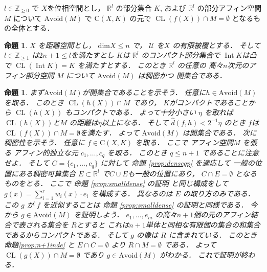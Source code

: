 \documentclass[leqno, a4paper, 12pt]{jsarticle}
\newtheorem{prop}[thm]{命題}
\newcommand{\zz}{\mathbb{Z}}
\newcommand{\rr}{\mathbb{R}}
\DeclareMathOperator{\cl}{CL}
\DeclareMathOperator{\nai}{Int}
\newcommand{\yodim}{\mathrm{dim}}
\newcommand{\yocovf}[1]{\mathcal{#1}}
\newcommand{\yosupmet}[1]{\widehat{#1}}
\newcommand{\yofuncsp}[2]{\mathrm{C}(#1, #2)}
\newcommand{\yoavoid}[1]{\mathrm{Avoid}(#1)}
\numberwithin{equation}{section}
\begin{document}
$l\in \zz_{\ge 0}$
で
$X$を位相空間とし，
$\rr^{l}$
の部分集合
$K$, および
$\rr^{l}$
の部分アフィン空間
$M$
について
$\yoavoid{M}$
で
$\yofuncsp{X}{K}$
の元で
$\cl (f(X))\cap M=\emptyset$
となるもの全体とする．
\begin{prop}
$X$
を距離空間とし，
$\yodim X\le n$
で，
$\yocovf{U}$
を$X$
の有限被覆とする．
そして
$l\in \zz_{\ge 1}$
は$2n+1\le l$を満たすとし
$K$は
$\rr^{l}$
のコンパクト部分集合で
$\nai K$は凸で
$\cl (\nai K)=K$
を満たすとする．
このとき
$\rr^{l}$
の任意の
高々$n$次元のアフィン部分空間
$M$
について
$\yoavoid{M}$
は稠密かつ
開集合である．
\end{prop}
\begin{prop}
まず$\yoavoid{M}$が開集合であることを示そう．
任意に$h\in \yoavoid{M}$
を取る．
このとき
$\cl(h(X))\cap M$
であり，
$K$がコンパクトであることから
$\cl(h(X))$
もコンパクトである．
よって十分小さい
$\eta$
を取れば
$\cl(h(X))$と$M$
の距離は$\eta$以上になる．
そして
$\yosupmet{d}(f, h)<2^{-1}\eta$
のとき
$f$は
$\cl(f(X))\cap M=\emptyset$を満たす．
よって
$\yoavoid{M}$
は開集合である．
次に稠密性を示そう．
任意に
$f\in \yofuncsp{X}{K}$
を取る．
ここで
アフィン空間$M$
を張る
アフィン的独立な元
$c_{1}, \dots, c_{q}$
を取る．
このとき
$q\le n+1$
であることに注意せよ．
そして
$C=\{c_{1}, \dots, c_{q}\}$
に対して
命題
\ref{prop:densegp}
を適応して
一般の位置にある稠密可算集合
$E\subset \rr^{l}$
で$C\cup E$も一般の位置にあり，
$C\cap E=\emptyset$
となるものをとる．
ここで
命題
\ref{prop:smalldense}
の証明
と同じ構成をして
$g(x)=\sum_{i=1}^{r}w_{i}(x)\cdot e_{i}$
を構成する．
異なるのは
$E$
の取り方のみである．
この
$g$
が
$f$
を近似することは
命題
\ref{prop:smalldense}
の証明と同様である．
今から
$g\in \yoavoid{M}$
を証明しよう．
$e_{1}, \dots, e_{m}$
の高々$n+1$個の元のアフィン結合で表される集合を
$R$とすると
これは$n+1$単体と同相な有限個の集合の和集合であるからコンパクトである．
そして
$g$
の像は
$R$
に含まれている．
このとき
命題\ref{prop:n+1inde}
と
$E\cap C=\emptyset$
より
$R\cap M=\emptyset$
である．
よって
$\cl(g(X))\cap M=\emptyset$
であり
$g\in \yoavoid{M}$
がわかる．
これで証明が終わる．
\end{prop}
\end{document}
